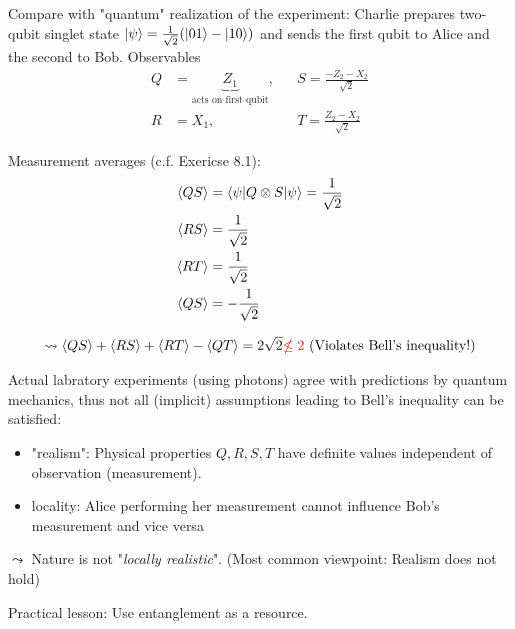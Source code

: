Compare with "quantum" realization of the experiment: 
Charlie prepares two-qubit singlet state $\lvert\psi\rangle = \frac{1}{\sqrt{2}} (\lvert01\rangle - \lvert10\rangle)$
and sends the first qubit to Alice and the second to Bob.
Observables
\begin{align*}
    Q &= \underbrace{Z_1}_{\text{acts on first qubit}}, 
        &&S = \frac{-Z_2 - X_2}{\sqrt{2}} \\
    R &= X_1, &&T = \frac{Z_2 - X_2}{\sqrt{2}}
\end{align*}

Measurement averages (c.f. Exericse 8.1):
\begin{align*}
    \left\langle  QS \right\rangle &= \left \langle \psi \middle| Q \otimes S \middle| \psi \right \rangle = \frac{1}{\sqrt{2}} \\
    \left\langle  RS \right\rangle &= \frac{1}{\sqrt{2}} \\
    \left\langle  RT \right\rangle &= \frac{1}{\sqrt{2}} \\
    \left\langle  QS \right\rangle &= -\frac{1}{\sqrt{2}} 
\end{align*}

\begin{equation*}
    \leadsto  
        \left\langle  QS \right\rangle + 
        \left\langle  RS \right\rangle + 
        \left\langle  RT \right\rangle - 
        \left\langle  QT \right\rangle = 2 \sqrt{2} {\color{red} \nleq 2} \text{ (Violates Bell's inequality!)}
\end{equation*}

Actual labratory experiments (using photons) agree with predictions by quantum mechanics, 
thus not all (implicit) assumptions leading to Bell's inequality can be satisfied: \\

\begin{itemize}
    \item "realism": Physical properties $Q, R, S, T$ have definite values independent of observation
    (measurement).
    \item locality: Alice performing her measurement cannot influence Bob's measurement and vice versa
\end{itemize}

$\leadsto$  Nature is not "\textit{locally realistic}". 
(Most common viewpoint: Realism does not hold)

Practical lesson: Use entanglement as a resource.